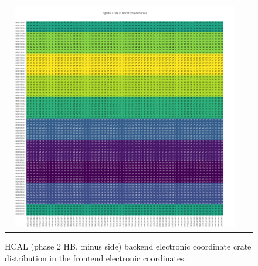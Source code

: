 \begin{figure}[htb]
 \begin{center}
  \begin{tabular}{cc}
   \includegraphics[angle=0,width=0.95\textwidth]{figures/appendix/ngHBM_Crate_in_FrontEnd.png}
  \end{tabular}
  \caption{HCAL (phase 2 HB, minus side) backend electronic coordinate crate distribution in the frontend electronic coordinates.}
  \label{fig:lmapngHBMCrateFEC}
 \end{center}
\end{figure}
\clearpage

